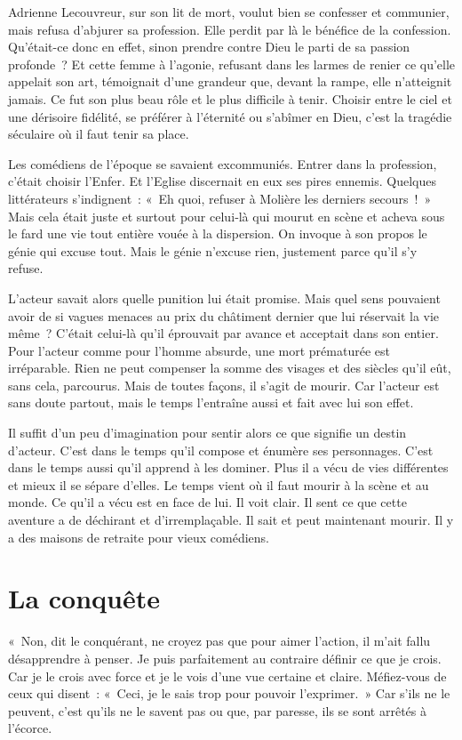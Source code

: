 \documentclass{book}
\begin{document}
Adrienne Lecouvreur, sur son lit de mort, voulut bien se confesser et communier, mais refusa d'abjurer sa profession. Elle perdit par là le bénéfice de la confession. Qu'était-ce donc en effet, sinon prendre contre Dieu le parti de sa passion profonde ? Et cette femme à l'agonie, refusant dans les larmes de renier ce qu'elle appelait son art, témoignait d'une grandeur que, devant la rampe, elle n'atteignit jamais. Ce fut son plus beau rôle et le plus difficile à tenir. Choisir entre le ciel et une dérisoire fidélité, se préférer à l'éternité ou s'abîmer en Dieu, c'est la tragédie séculaire où il faut tenir sa place.

Les comédiens de l'époque se savaient excommuniés. Entrer dans la profession, c'était choisir l'Enfer. Et l'Eglise discernait en eux ses pires ennemis. Quelques littérateurs s'indignent : « Eh quoi, refuser à Molière les derniers secours ! » Mais cela était juste et surtout pour celui‑là qui mourut en scène et acheva sous le fard une vie tout entière vouée à la dispersion. On invoque à son propos le génie qui excuse tout. Mais le génie n'excuse rien, justement parce qu'il s'y refuse.

L'acteur savait alors quelle punition lui était promise. Mais quel sens pouvaient avoir de si vagues menaces au prix du châtiment dernier que lui réservait la vie même ? C'était celui-là qu'il éprouvait par avance et acceptait dans son entier. Pour l'acteur comme pour l'homme absurde, une mort prématurée est irréparable. Rien ne peut compenser la somme des visages et des siècles qu'il eût, sans cela, parcourus. Mais de toutes façons, il s'agit de mourir. Car l'acteur est sans doute partout, mais le temps l'entraîne aussi et fait avec lui son effet.

Il suffit d'un peu d'imagination pour sentir alors ce que signifie un destin d'acteur. C'est dans le temps qu'il compose et énumère ses personnages. C'est dans le temps aussi qu'il apprend à les dominer. Plus il a vécu de vies différentes et mieux il se sépare d'elles. Le temps vient où il faut mourir à la scène et au monde. Ce qu'il a vécu est en face de lui. Il voit clair. Il sent ce que cette aventure a de déchirant et d'irremplaçable. Il sait et peut maintenant mourir. Il y a des maisons de retraite pour vieux comédiens.

\section{La conquête}

« Non, dit le conquérant, ne croyez pas que pour aimer l'action, il m'ait fallu désapprendre à penser. Je puis parfaitement au contraire définir ce que je crois. Car je le crois avec force et je le vois d'une vue certaine et claire. Méfiez-vous de ceux qui disent : « Ceci, je le sais trop pour pouvoir l'exprimer. » Car s'ils ne le peuvent, c'est qu'ils ne le savent pas ou que, par paresse, ils se sont arrêtés à l'écorce.
\end{document}
